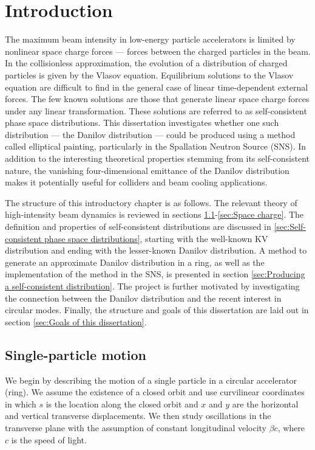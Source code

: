 \chapter{Introduction}\label{chap-1}

The maximum beam intensity in low-energy particle accelerators is limited by nonlinear space charge forces — forces between the charged particles in the beam. In the collisionless approximation, the evolution of a distribution of charged particles is given by the Vlasov equation. Equilibrium solutions to the Vlasov equation are difficult to find in the general case of linear time-dependent external forces. The few known solutions are those that generate linear space charge forces under any linear transformation. These solutions are referred to as self-consistent phase space distributions. This dissertation investigates whether one such distribution — the Danilov distribution — could be produced using a method called elliptical painting, particularly in the Spallation Neutron Source (SNS). In addition to the interesting theoretical properties stemming from its self-consistent nature, the vanishing four-dimensional emittance of the Danilov distribution makes it potentially useful for colliders and beam cooling applications.

The structure of this introductory chapter is as follows. The relevant theory of high-intensity beam dynamics is reviewed in sections \ref{sec:Single-particle motion}-\ref{sec:Space charge}. The definition and properties of self-consistent distributions are discussed in \ref{sec:Self-consistent phase space distributions}, starting with the well-known KV distribution and ending with the lesser-known Danilov distribution. A method to generate an approximate Danilov distribution in a ring, as well as the implementation of the method in the SNS, is presented in section \ref{sec:Producing a self-consistent distribution}. The project is further motivated by investigating the connection between the Danilov distribution and the recent interest in circular modes. Finally, the structure and goals of this dissertation are laid out in section \ref{sec:Goals of this dissertation}.




\section{Single-particle motion}\label{sec:Single-particle motion}

We begin by describing the motion of a single particle in a circular accelerator (ring). We assume the existence of a closed orbit and use curvilinear coordinates in which $s$ is the location along the closed orbit and $x$ and $y$ are the horizontal and vertical transverse displacements. We then study oscillations in the transverse plane with the assumption of constant longitudinal velocity $\beta c$, where $c$ is the speed of light.

